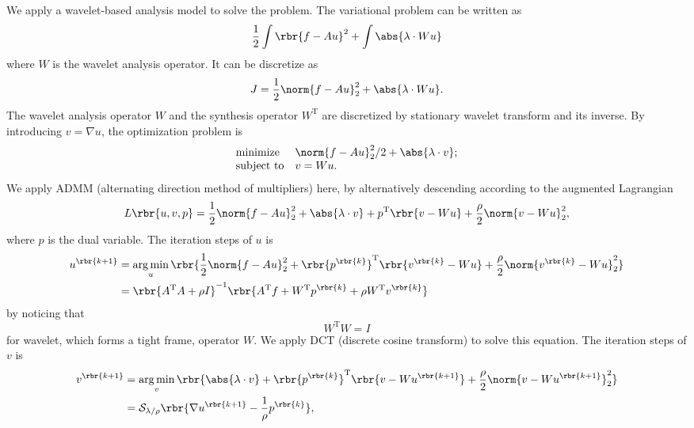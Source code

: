 \documentclass[english, nochinese]{pnote}
\begin{document}
We apply a wavelet-based analysis model to solve the problem. The variational problem can be written as
\begin{equation}
\frac{1}{2} \int \rbr{ f - A u }^2 + \int \abs{ \lambda \cdot W u }
\end{equation}
where $W$ is the wavelet analysis operator. It can be discretize as
\begin{equation}
J = \frac{1}{2} \norm{ f - A u }_2^2 + \abs{ \lambda \cdot W u }.
\end{equation}
The wavelet analysis operator $W$ and the synthesis operator $W^{\text{T}}$ are discretized by stationary wavelet transform and its inverse. By introducing $ v = \nabla u $, the optimization problem is
\begin{equation}
\begin{array}{ll}
\text{minimize} & \norm{ f - A u }_2^2 / 2 + \abs{ \lambda \cdot v }; \\
\text{subject to} & v = W u.
\end{array}
\end{equation}
We apply ADMM (alternating direction method of multipliers) here, by alternatively descending according to the augmented Lagrangian
\begin{equation}
L \rbr{ u, v, p } = \frac{1}{2} \norm{ f - A u }_2^2 + \abs{ \lambda \cdot v } + p^{\text{T}} \rbr{ v - W u } + \frac{\rho}{2} \norm{ v - W u }_2^2,
\end{equation}
where $p$ is the dual variable. The iteration steps of $u$ is
\begin{equation}
\begin{split}
u^{\rbr{ k + 1 }} &= \mathop{\arg\min}_u \rbr{ \frac{1}{2} \norm{ f - A u }_2^2 + \rbr{p^{\rbr{k}}}^{\text{T}} \rbr{ v^{\rbr{k}} - W u } + \frac{\rho}{2} \norm{ v^{\rbr{k}} - W u }_2^2 } \\
&= \rbr{ A^{\text{T}} A + \rho I }^{-1} \rbr{ A^{\text{T}} f + W^{\text{T}} p^{\rbr{k}} + \rho W^{\text{T}} v^{\rbr{k}} }
\end{split}
\end{equation}
by noticing that
\begin{equation}
W^{\text{T}} W = I
\end{equation}
for wavelet, which forms a tight frame, operator $W$. We apply DCT (discrete cosine transform) to solve this equation. The iteration steps of $v$ is
\begin{equation}
\begin{split}
v^{\rbr{ k + 1 }} &= \mathop{\arg\min}_v \rbr{ \abs{ \lambda \cdot v } + \rbr{p^{\rbr{k}}}^{\text{T}} \rbr{ v - W u^{\rbr{ k + 1 }} } + \frac{\rho}{2} \norm{ v - W u^{\rbr{ k + 1 }} }_2^2 } \\
&= \mathcal{S}_{ \lambda / \rho } \rbr{ \nabla u^{\rbr{ k + 1 }} - \frac{1}{\rho} p^{\rbr{k}} },
\end{split}
\end{equation}
\end{document}
